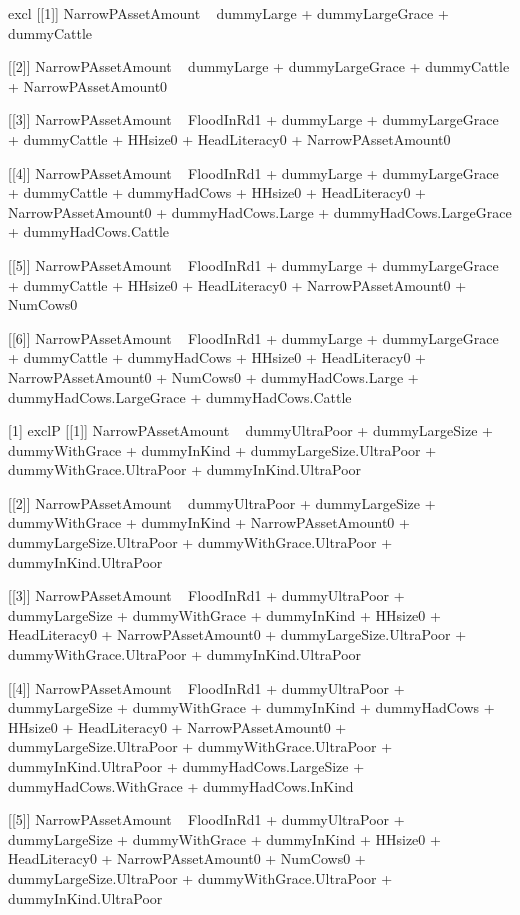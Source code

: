 \begin{Schunk}
\begin{Soutput}
[1] excl
[[1]]
NarrowPAssetAmount ~ dummyLarge + dummyLargeGrace + dummyCattle

[[2]]
NarrowPAssetAmount ~ dummyLarge + dummyLargeGrace + dummyCattle + 
    NarrowPAssetAmount0

[[3]]
NarrowPAssetAmount ~ FloodInRd1 + dummyLarge + dummyLargeGrace + 
    dummyCattle + HHsize0 + HeadLiteracy0 + NarrowPAssetAmount0

[[4]]
NarrowPAssetAmount ~ FloodInRd1 + dummyLarge + dummyLargeGrace + 
    dummyCattle + dummyHadCows + HHsize0 + HeadLiteracy0 + NarrowPAssetAmount0 + 
    dummyHadCows.Large + dummyHadCows.LargeGrace + dummyHadCows.Cattle

[[5]]
NarrowPAssetAmount ~ FloodInRd1 + dummyLarge + dummyLargeGrace + 
    dummyCattle + HHsize0 + HeadLiteracy0 + NarrowPAssetAmount0 + 
    NumCows0

[[6]]
NarrowPAssetAmount ~ FloodInRd1 + dummyLarge + dummyLargeGrace + 
    dummyCattle + dummyHadCows + HHsize0 + HeadLiteracy0 + NarrowPAssetAmount0 + 
    NumCows0 + dummyHadCows.Large + dummyHadCows.LargeGrace + 
    dummyHadCows.Cattle

[1] exclP
[[1]]
NarrowPAssetAmount ~ dummyUltraPoor + dummyLargeSize + dummyWithGrace + 
    dummyInKind + dummyLargeSize.UltraPoor + dummyWithGrace.UltraPoor + 
    dummyInKind.UltraPoor

[[2]]
NarrowPAssetAmount ~ dummyUltraPoor + dummyLargeSize + dummyWithGrace + 
    dummyInKind + NarrowPAssetAmount0 + dummyLargeSize.UltraPoor + 
    dummyWithGrace.UltraPoor + dummyInKind.UltraPoor

[[3]]
NarrowPAssetAmount ~ FloodInRd1 + dummyUltraPoor + dummyLargeSize + 
    dummyWithGrace + dummyInKind + HHsize0 + HeadLiteracy0 + 
    NarrowPAssetAmount0 + dummyLargeSize.UltraPoor + dummyWithGrace.UltraPoor + 
    dummyInKind.UltraPoor

[[4]]
NarrowPAssetAmount ~ FloodInRd1 + dummyUltraPoor + dummyLargeSize + 
    dummyWithGrace + dummyInKind + dummyHadCows + HHsize0 + HeadLiteracy0 + 
    NarrowPAssetAmount0 + dummyLargeSize.UltraPoor + dummyWithGrace.UltraPoor + 
    dummyInKind.UltraPoor + dummyHadCows.LargeSize + dummyHadCows.WithGrace + 
    dummyHadCows.InKind

[[5]]
NarrowPAssetAmount ~ FloodInRd1 + dummyUltraPoor + dummyLargeSize + 
    dummyWithGrace + dummyInKind + HHsize0 + HeadLiteracy0 + 
    NarrowPAssetAmount0 + NumCows0 + dummyLargeSize.UltraPoor + 
    dummyWithGrace.UltraPoor + dummyInKind.UltraPoor


\end{Soutput}
\end{Schunk}
